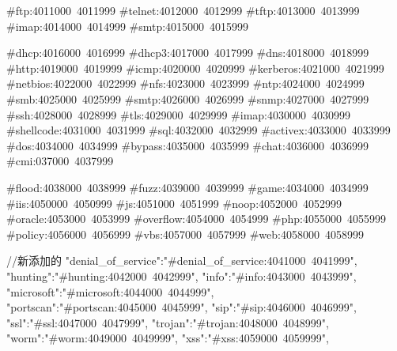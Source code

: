 #ftp:4011000~4011999
#telnet:4012000~4012999
#tftp:4013000~4013999
#imap:4014000~4014999
#smtp:4015000~4015999

#dhcp:4016000~4016999
#dhcp3:4017000~4017999
#dns:4018000~4018999
#http:4019000~4019999
#icmp:4020000~4020999
#kerberos:4021000~4021999
#netbios:4022000~4022999
#nfs:4023000~4023999
#ntp:4024000~4024999
#smb:4025000~4025999
#smtp:4026000~4026999
#snmp:4027000~4027999
#ssh:4028000~4028999
#tls:4029000~4029999
#imap:4030000~4030999
#shellcode:4031000~4031999
#sql:4032000~4032999
#activex:4033000~4033999
#dos:4034000~4034999
#bypass:4035000~4035999
#chat:4036000~4036999
#cmi:037000~4037999

#flood:4038000~4038999
#fuzz:4039000~4039999
#game:4034000~4034999
#iis:4050000~4050999
#js:4051000~4051999
#noop:4052000~4052999
#oracle:4053000~4053999
#overflow:4054000~4054999
#php:4055000~4055999
#policy:4056000~4056999
#vbs:4057000~4057999
#web:4058000~4058999




//新添加的
	"denial_of_service":"#denial_of_service:4041000~4041999",
	"hunting":"#hunting:4042000~4042999",
	"info":"#info:4043000~4043999",
	"microsoft":"#microsoft:4044000~4044999",
	"portscan":"#portscan:4045000~4045999",
	"sip":"#sip:4046000~4046999",
	"ssl":"#ssl:4047000~4047999",
	"trojan":"#trojan:4048000~4048999",
	"worm":"#worm:4049000~4049999",
	"xss":"#xss:4059000~4059999",
